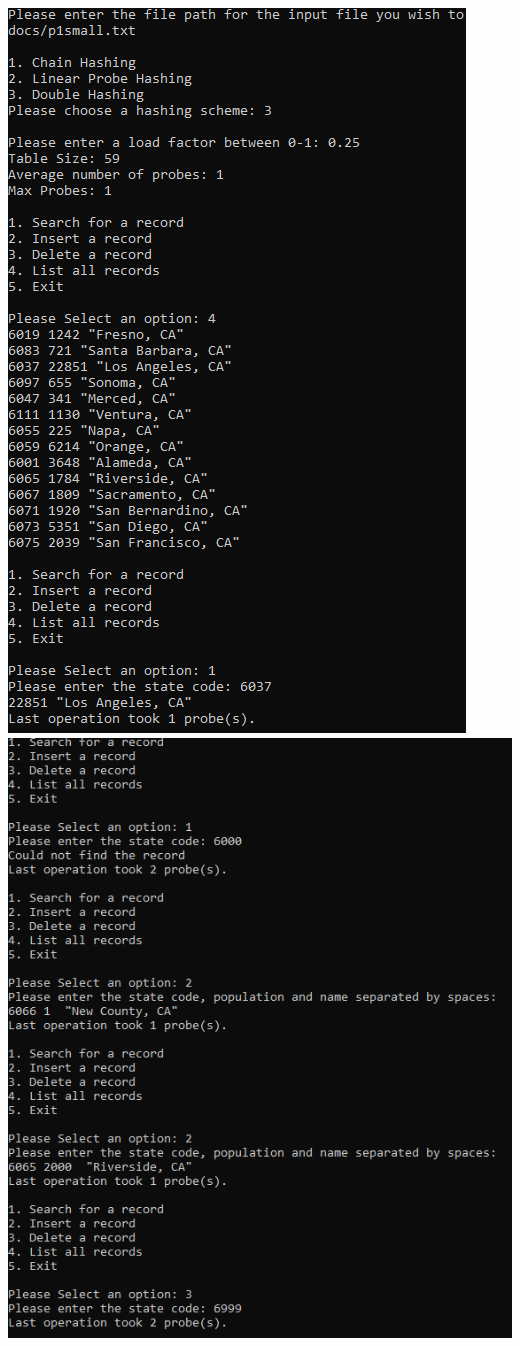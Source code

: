 \documentclass[titlepage]{article}
\begin{document}
\includegraphics[]{Small_Input/LF_0_25/DoubleHash_1.png} \newpage
\includegraphics[]{Small_Input/LF_0_25/DoubleHash_2.png} \newpage
\end{document}
